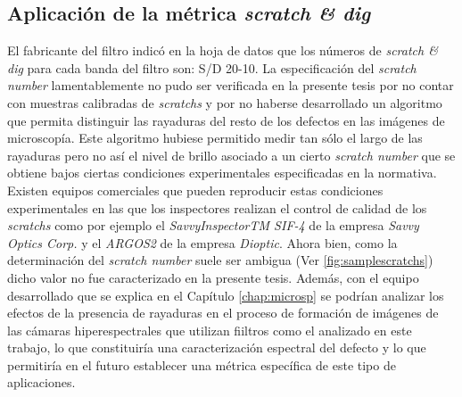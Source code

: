 \subsection{Aplicación de la métrica \textit{scratch \& dig}}
\label{sec:sctdig}

\hspace{0.5cm}El fabricante del filtro indicó en la hoja de datos que los números de \textit{scratch \& dig} para cada banda del filtro son: S/D 20-10. La especificación del \textit{scratch number} lamentablemente no pudo ser verificada en la presente tesis por no contar con muestras calibradas de \textit{scratchs} y por no haberse desarrollado un algoritmo que permita distinguir las rayaduras del resto de los defectos en las imágenes de microscopía. Este algoritmo hubiese permitido medir tan sólo el largo de las rayaduras pero no así el nivel de brillo asociado a un cierto \textit{scratch number} que se obtiene bajos ciertas condiciones experimentales especificadas en la normativa. Existen equipos comerciales que pueden reproducir estas condiciones experimentales en las que los inspectores realizan el control de calidad de los \textit{scratchs} como por ejemplo el \textit{SavvyInspectorTM SIF-4} de la empresa \textit{Savvy Optics Corp.} y el \textit{ARGOS2} de la empresa \textit{Dioptic}. Ahora bien, como la determinación del \textit{scratch number} suele ser ambigua (Ver \ref{fig:samplescratchs}) dicho valor no fue caracterizado en la presente tesis. Además, con el equipo desarrollado que se explica en el Capítulo \ref{chap:microsp} se podrían analizar los efectos de la presencia de rayaduras en el proceso de formación de imágenes de las cámaras hiperespectrales que utilizan fiiltros como el analizado en este trabajo, lo que constituiría una caracterización espectral del defecto y lo que permitiría en el futuro establecer una métrica específica de este tipo de aplicaciones.


